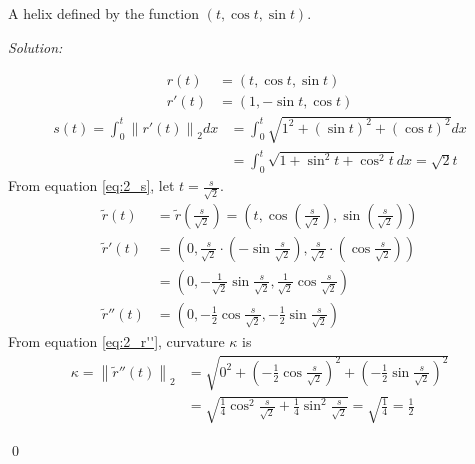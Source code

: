\documentclass[12pt]{article}
\newenvironment{problem}[2][Problem]{\begin{trivlist}
\item[\hskip \labelsep {\bfseries #1}\hskip \labelsep {\bfseries #2.}]}{\end{trivlist}}
\newenvironment{sol}
{\emph{Solution:}
}
{
    \qed
    }
\begin{document}
\begin{problem}{2}
    A helix defined by the function $(t, \cos{t}, \sin{t})$.
\end{problem}

\begin{center}
\end{center}

\begin{sol}
    \begin{align}
        r(t)  &= (t, \cos{t}, \sin{t}) \nonumber \\
        r'(t) &= (1, -\sin{t}, \cos{t}) \nonumber
    \end{align}
    \begin{align}
        s(t) = \int_0^t \left\lVert r'(t) \right\rVert_2 dx &= \int_0^t \sqrt{1^2+(\sin{t})^2+(\cos{t}) ^2}dx \nonumber\\ 
                                                            &= \int_0^t \sqrt{1+\sin^2{t}+\cos^2{t}} dx = \sqrt{2}t \label{eq:2_s} 
    \end{align}
    From equation \ref{eq:2_s}, let $t=\frac{s}{\sqrt{2}}$.
    \begin{align}
        \tilde{r}(t)   &= \tilde{r} \left(\frac{s}{\sqrt{2}} \right) = \left(t, \cos\left(\frac{s}{\sqrt{2}}\right), \sin\left(\frac{s}{\sqrt{2}}\right)\right) \nonumber\\
        \tilde{r}'(t)  &= \left( 0, \frac{s}{\sqrt{2}} \cdot \left(-\sin\frac{s}{\sqrt{2}}\right), \frac{s}{\sqrt{2}} \cdot \left(\cos\frac{s}{\sqrt{2}}\right) \right) \nonumber\\
                       &= \left( 0, -\frac{1}{\sqrt{2}}\sin\frac{s}{\sqrt{2}}, \frac{1}{\sqrt{2}}\cos\frac{s}{\sqrt{2}} \right) \nonumber\\
        \tilde{r}''(t) &= \left( 0, -\frac{1}{2} \cos\frac{s}{\sqrt{2}}, -\frac{1}{2} \sin\frac{s}{\sqrt{2}} \right) \label{eq:2_r''}
    \end{align}
    From equation \ref{eq:2_r''}, curvature $\kappa$ is
    \begin{align}
        \kappa = \left\lVert \tilde{r}''(t) \right\rVert_2 &= \sqrt{0^2 + \left( -\frac{1}{2} \cos\frac{s}{\sqrt{2}} \right)^2 + \left( -\frac{1}{2} \sin\frac{s}{\sqrt{2}} \right)^2} \nonumber\\
                                                           &= \sqrt{\frac{1}{4} \cos^2\frac{s}{\sqrt{2}} + \frac{1}{4} \sin^2\frac{s}{\sqrt{2}}} = \sqrt{\frac{1}{4}} = \frac{1}{2} \nonumber
    \end{align}
\end{sol}
\end{document}
